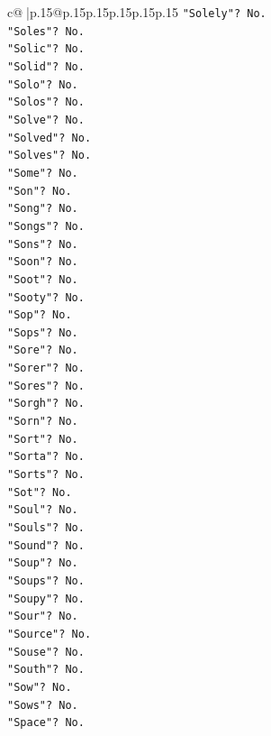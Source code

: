 \documentclass{article}
\begin{document}
{\begin{supertabular}{c@{$\;$}|p{.15\linewidth}@{}p{.15\linewidth}p{.15\linewidth}p{.15\linewidth}p{.15\linewidth}p{.15\linewidth}}
{{{\texttt{"Solely"? No.} \\
\texttt{"Soles"? No.} \\
\texttt{"Solic"? No.} \\
\texttt{"Solid"? No.} \\
\texttt{"Solo"? No.} \\
\texttt{"Solos"? No.} \\
\texttt{"Solve"? No.} \\
\texttt{"Solved"? No.} \\
\texttt{"Solves"? No.} \\
\texttt{"Some"? No.} \\
\texttt{"Son"? No.} \\
\texttt{"Song"? No.} \\
\texttt{"Songs"? No.} \\
\texttt{"Sons"? No.} \\
\texttt{"Soon"? No.} \\
\texttt{"Soot"? No.} \\
\texttt{"Sooty"? No.} \\
\texttt{"Sop"? No.} \\
\texttt{"Sops"? No.} \\
\texttt{"Sore"? No.} \\
\texttt{"Sorer"? No.} \\
\texttt{"Sores"? No.} \\
\texttt{"Sorgh"? No.} \\
\texttt{"Sorn"? No.} \\
\texttt{"Sort"? No.} \\
\texttt{"Sorta"? No.} \\
\texttt{"Sorts"? No.} \\
\texttt{"Sot"? No.} \\
\texttt{"Soul"? No.} \\
\texttt{"Souls"? No.} \\
\texttt{"Sound"? No.} \\
\texttt{"Soup"? No.} \\
\texttt{"Soups"? No.} \\
\texttt{"Soupy"? No.} \\
\texttt{"Sour"? No.} \\
\texttt{"Source"? No.} \\
\texttt{"Souse"? No.} \\
\texttt{"South"? No.} \\
\texttt{"Sow"? No.} \\
\texttt{"Sows"? No.} \\
\texttt{"Space"? No.} \\
}}}
\end{supertabular}}
\end{document}
